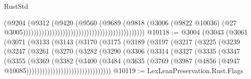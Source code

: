 \begin{lexlean}{RustStd}
\begin{coremodule}
                                                                                (@9204
                                                                                  (@9312
                                                                                    (@9420
                                                                                      (@9560
                                                                                        (@9689
                                                                                          (@9818
                                                                                            (@3006
                                                                                              (@9822
                                                                                                @10036)
                                                                                              (@27
                                                                                                @3005))))))))))))))))))))))))))))))))))))))))))))))
@10118 := @3004
    (@3043
      (@3061
        (@3071
          (@3133
            (@3143
              (@3170
                (@3175
                  (@3189
                    (@3197
                      (@3217
                        (@3225
                          (@3239
                            (@3247
                              (@3261
                                (@3270
                                  (@3282
                                    (@3290
                                      (@3306
                                        (@3314
                                          (@3327
                                            (@3335
                                              (@3347
                                                (@3355
                                                  (@3369
                                                    (@3382
                                                      (@3400
                                                        (@3484
                                                          (@3635
                                                            (@3769
                                                              (@3987
                                                                (@4856
                                                                  (@4947
                                                                    @10085))))))))))))))))))))))))))))))))
@10119 := LexLeanPreservation.Rust.Flags

\end{coremodule}
\end{lexlean}
